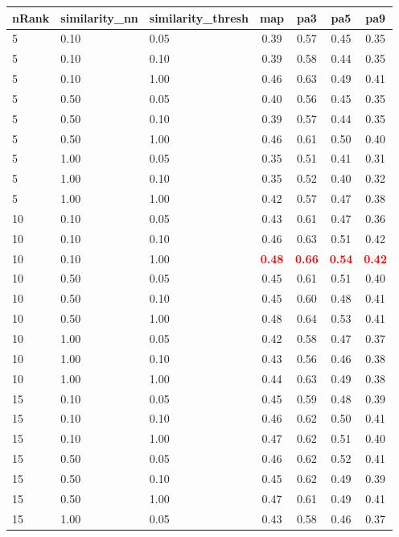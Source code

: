   
\begin{table} 
\begin{center} 
\scriptsize 
 \setlength{\tabcolsep}{.16667em} 
\begin{tabular}{lllcccc} 
nRank & similarity\_nn & similarity\_thresh & map & pa3 & pa5 & pa9 \\ 
\hline 
 5 & 0.10 & 0.05 & 0.39 & 0.57 & 0.45 & 0.35 \\ 
 5 & 0.10 & 0.10 & 0.39 & 0.58 & 0.44 & 0.35 \\ 
 5 & 0.10 & 1.00 & 0.46 & 0.63 & 0.49 & 0.41 \\ 
 5 & 0.50 & 0.05 & 0.40 & 0.56 & 0.45 & 0.35 \\ 
 5 & 0.50 & 0.10 & 0.39 & 0.57 & 0.44 & 0.35 \\ 
 5 & 0.50 & 1.00 & 0.46 & 0.61 & 0.50 & 0.40 \\ 
 5 & 1.00 & 0.05 & 0.35 & 0.51 & 0.41 & 0.31 \\ 
 5 & 1.00 & 0.10 & 0.35 & 0.52 & 0.40 & 0.32 \\ 
 5 & 1.00 & 1.00 & 0.42 & 0.57 & 0.47 & 0.38 \\ 
10 & 0.10 & 0.05 & 0.43 & 0.61 & 0.47 & 0.36 \\ 
10 & 0.10 & 0.10 & 0.46 & 0.63 & 0.51 & 0.42 \\ 
10 & 0.10 & 1.00 & \textbf{\textcolor{red}{0.48}} & \textbf{\textcolor{red}{0.66}} & \textbf{\textcolor{red}{0.54}} & \textbf{\textcolor{red}{0.42}} \\ 
10 & 0.50 & 0.05 & 0.45 & 0.61 & 0.51 & 0.40 \\ 
10 & 0.50 & 0.10 & 0.45 & 0.60 & 0.48 & 0.41 \\ 
10 & 0.50 & 1.00 & 0.48 & 0.64 & 0.53 & 0.41 \\ 
10 & 1.00 & 0.05 & 0.42 & 0.58 & 0.47 & 0.37 \\ 
10 & 1.00 & 0.10 & 0.43 & 0.56 & 0.46 & 0.38 \\ 
10 & 1.00 & 1.00 & 0.44 & 0.63 & 0.49 & 0.38 \\ 
15 & 0.10 & 0.05 & 0.45 & 0.59 & 0.48 & 0.39 \\ 
15 & 0.10 & 0.10 & 0.46 & 0.62 & 0.50 & 0.41 \\ 
15 & 0.10 & 1.00 & 0.47 & 0.62 & 0.51 & 0.40 \\ 
15 & 0.50 & 0.05 & 0.46 & 0.62 & 0.52 & 0.41 \\ 
15 & 0.50 & 0.10 & 0.45 & 0.62 & 0.49 & 0.39 \\ 
15 & 0.50 & 1.00 & 0.47 & 0.61 & 0.49 & 0.41 \\ 
15 & 1.00 & 0.05 & 0.43 & 0.58 & 0.46 & 0.37 \\ 

\end{tabular}
\end{center}
\end{table}

